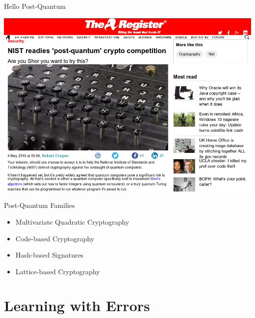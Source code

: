 \documentclass[presentation,smaller]{beamer}
\begin{document}
\begin{frame}[label={sec:orgheadline3}]{Hello Post-Quantum}
\begin{center}
\includegraphics[width=.9\linewidth]{./competition.png}
\end{center}
\end{frame}


\begin{frame}[label={sec:orgheadline4}]{Post-Quantum Families}
\begin{itemize}
\item Multivariate Quadratic Cryptography
\item Code-based Cryptography
\item Hash-based Signatures
\item \alert<2->{Lattice-based Cryptography}
\end{itemize}
\end{frame}

\section{Learning with Errors}
\label{sec:orgheadline19}
\end{document}
